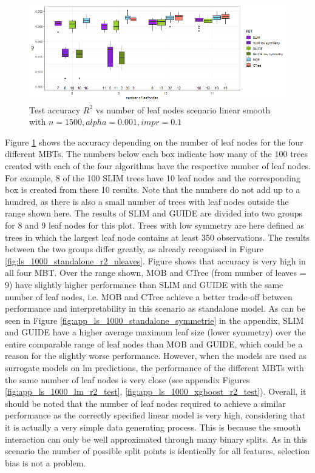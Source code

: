\begin{figure}[!htb] 
\centering
    \includegraphics[width=16cm]{Figures/simulations/chapter_5_simulation_study/basic_scenarios/linear_smooth/ls_1000_standalone_r2_test.png}
    \caption{Test accuracy $R^2$ vs number of leaf nodes scenario linear smooth with $n=1500, alpha = 0.001, impr = 0.1$}
    \label{fig:ls_1000_standalone_r2_test}
\end{figure} 

Figure \ref{fig:ls_1000_standalone_r2_test} shows the accuracy depending on the number of leaf nodes for the four different MBTs.
The numbers below each box indicate how many of the $100$ trees created with each of the four algorithms have the respective number of leaf nodes. For example, 8 of the 100 SLIM trees have 10 leaf nodes and the corresponding box is created from these 10 results. Note that the numbers do not add up to a hundred, as there is also a small number of trees with leaf nodes outside the range shown here. The results of SLIM and GUIDE are divided into two groups for 8 and 9 leaf nodes for this plot. Trees with low symmetry are here defined as trees in which the largest leaf node contains at least 350 observations. The results between the two groups differ greatly, as already recognised in Figure \ref{fig:ls_1000_standalone_r2_nleaves}.
Figure shows that accuracy is very high in all four MBT. Over the range shown, MOB and CTree (from number of leaves = 9) have slightly higher performance than SLIM and GUIDE with the same number of leaf nodes, i.e. MOB and CTree achieve a better trade-off between performance and interpretability in this scenario as standalone model.
As can be seen in Figure \ref{fig:app_ls_1000_standalone_symmetrie} in the appendix, SLIM and GUIDE have a higher average maximum leaf size (lower symmetry) over the entire comparable range of leaf nodes than MOB and GUIDE, which could be a reason for the slightly worse performance.
However, when the models are used as surrogate models on lm predictions, the performance of the different MBTs with the same number of leaf nodes is very close (see appendix Figures \ref{fig:app_ls_1000_lm_r2_test}, \ref{fig:app_ls_1000_xgboost_r2_test}).
Overall, it should  be noted that the number of leaf nodes required to achieve a similar performance as the correctly specified linear model is very high, considering that it is actually a very simple data generating process. This is because the smooth interaction can only be well approximated through many binary splits. 
As in this scenario the number of possible split points is identically for all features, selection bias is not a problem.






